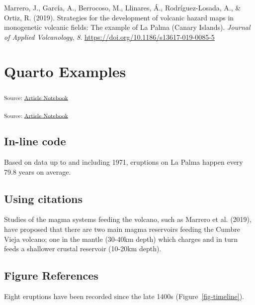 \documentclass[
]{agujournal2019}
\newlength{\cslhangindent}
\newenvironment{CSLReferences}[2] %
 {\begin{list}{}{%
  \setlength{\itemindent}{0pt}
  \setlength{\leftmargin}{0pt}
  \setlength{\parsep}{0pt}
  \ifodd #1
   \setlength{\leftmargin}{\cslhangindent}
   \setlength{\itemindent}{-1\cslhangindent}
  \fi
  \setlength{\itemsep}{#2\baselineskip}}}
 {\end{list}}
\begin{document}
\protect{}\label{refs}
\begin{CSLReferences}{1}{0}
\vspace{1em}

Marrero, J., García, A., Berrocoso, M., Llinares, Á., Rodríguez-Losada,
A., \& Ortiz, R. (2019). Strategies for the development of volcanic
hazard maps in monogenetic volcanic fields: The example of {La} {Palma}
({Canary} {Islands}). \emph{Journal of Applied Volcanology}, \emph{8}.
\url{https://doi.org/10.1186/s13617-019-0085-5}

\end{CSLReferences}

\section{Quarto Examples}\label{sec-examples}

\textsubscript{Source:
\href{https://KamrynMansfield.github.io/manuscript_template/index.qmd.html}{Article
Notebook}}

\textsubscript{Source:
\href{https://KamrynMansfield.github.io/manuscript_template/index.qmd.html}{Article
Notebook}}

\subsection{In-line code}\label{in-line-code}

Based on data up to and including 1971, eruptions on La Palma happen
every 79.8 years on average.

\subsection{Using citations}\label{using-citations}

Studies of the magma systems feeding the volcano, such as Marrero et al.
(2019), have proposed that there are two main magma reservoirs feeding
the Cumbre Vieja volcano; one in the mantle (30-40km depth) which
charges and in turn feeds a shallower crustal reservoir (10-20km depth).

\subsection{Figure References}\label{figure-references}

Eight eruptions have been recorded since the late 1400s
(Figure~\ref{fig-timeline}).
\end{document}
